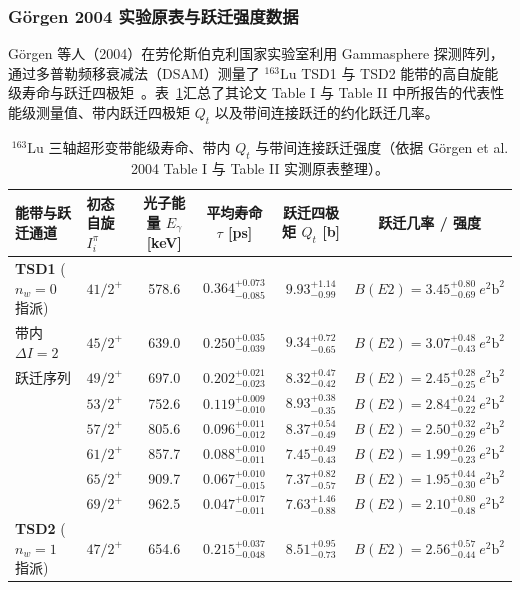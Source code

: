 \subsubsection{Görgen 2004 实验原表与跃迁强度数据}

Görgen 等人（2004）在劳伦斯伯克利国家实验室利用 Gammasphere 探测阵列，通过多普勒频移衰减法（DSAM）测量了 $^{163}\mathrm{Lu}$ TSD1 与 TSD2 能带的高自旋能级寿命与跃迁四极矩~\cite{campaign-g07-gorgen-2004-163lu-quadrupole-moments}。表~\ref{tab:4-4-lu163-sample}汇总了其论文 Table I 与 Table II 中所报告的代表性能级测量值、带内跃迁四极矩 $Q_t$ 以及带间连接跃迁的约化跃迁几率。

\begin{table}[!htbp]
\centering
\small
\caption{$^{163}\mathrm{Lu}$ 三轴超形变带能级寿命、带内 $Q_t$ 与带间连接跃迁强度（依据 Görgen et al. 2004 Table I 与 Table II 实测原表整理）。}\label{tab:4-4-lu163-sample}
\begin{tabularx}{\textwidth}{llcccc}
\hline\hline
能带与跃迁通道 & 初态自旋 $I_i^\pi$ & 光子能量 $E_\gamma$ [keV] & 平均寿命 $\tau$ [ps] & 跃迁四极矩 $Q_t$ [b] & 跃迁几率 / 强度 \\
\hline
\textbf{TSD1} ($n_w=0$ 指派) & $41/2^+$ & 578.6 & $0.364_{-0.085}^{+0.073}$ & $9.93_{-0.99}^{+1.14}$ & $B(E2) = 3.45_{-0.69}^{+0.80}\ e^2\mathrm{b}^2$ \\
带内 $\Delta I = 2$ & $45/2^+$ & 639.0 & $0.250_{-0.039}^{+0.035}$ & $9.34_{-0.65}^{+0.72}$ & $B(E2) = 3.07_{-0.43}^{+0.48}\ e^2\mathrm{b}^2$ \\
跃迁序列 & $49/2^+$ & 697.0 & $0.202_{-0.023}^{+0.021}$ & $8.32_{-0.42}^{+0.47}$ & $B(E2) = 2.45_{-0.25}^{+0.28}\ e^2\mathrm{b}^2$ \\
& $53/2^+$ & 752.6 & $0.119_{-0.010}^{+0.009}$ & $8.93_{-0.35}^{+0.38}$ & $B(E2) = 2.84_{-0.22}^{+0.24}\ e^2\mathrm{b}^2$ \\
& $57/2^+$ & 805.6 & $0.096_{-0.012}^{+0.011}$ & $8.37_{-0.49}^{+0.54}$ & $B(E2) = 2.50_{-0.29}^{+0.32}\ e^2\mathrm{b}^2$ \\
& $61/2^+$ & 857.7 & $0.088_{-0.011}^{+0.010}$ & $7.45_{-0.43}^{+0.49}$ & $B(E2) = 1.99_{-0.23}^{+0.26}\ e^2\mathrm{b}^2$ \\
& $65/2^+$ & 909.7 & $0.067_{-0.015}^{+0.010}$ & $7.37_{-0.57}^{+0.82}$ & $B(E2) = 1.95_{-0.30}^{+0.44}\ e^2\mathrm{b}^2$ \\
& $69/2^+$ & 962.5 & $0.047_{-0.011}^{+0.017}$ & $7.63_{-0.88}^{+1.46}$ & $B(E2) = 2.10_{-0.48}^{+0.80}\ e^2\mathrm{b}^2$ \\
\hline
\textbf{TSD2} ($n_w=1$ 指派) & $47/2^+$ & 654.6 & $0.215_{-0.048}^{+0.037}$ & $8.51_{-0.73}^{+0.95}$ & $B(E2) = 2.56_{-0.44}^{+0.57}\ e^2\mathrm{b}^2$ \\

\end{tabularx}
\end{table}
